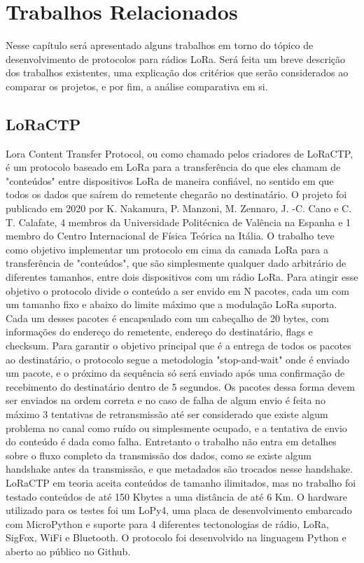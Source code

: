 \chapter{Trabalhos Relacionados}

Nesse capítulo será apresentado alguns trabalhos em torno do tópico de desenvolvimento
de protocolos para rádios LoRa. Será feita um breve descrição dos trabalhos existentes,
uma explicação dos critérios que serão considerados ao comparar os projetos, e por fim, a
análise comparativa em si.

\section{LoRaCTP}

Lora Content Transfer Protocol, ou como chamado pelos criadores de LoRaCTP, é um 
protocolo baseado em LoRa para a transferência do que eles chamam de "conteúdos" entre dispositivos LoRa de maneira confiável, no sentido em que todos os dados que saírem do
remetente chegarão no destinatário. O projeto foi publicado em 2020 por K. Nakamura, P. Manzoni, M. Zennaro, J. -C. Cano e C. T. Calafate, 4 membros da Universidade Politécnica de Valência na 
Espanha e 1 membro do Centro Internacional de Física Teórica na Itália. O trabalho teve
como objetivo implementar um protocolo em cima da camada LoRa para a transferência de "conteúdos", que são simplesmente qualquer dado arbitrário de diferentes tamanhos, entre dois dispositivos com um rádio LoRa. Para atingir esse objetivo o protocolo divide o
conteúdo a ser envido em N pacotes, cada um com um tamanho fixo e 
abaixo do limite máximo que a modulação LoRa suporta. Cada um desses pacotes é encapsulado com um cabeçalho de 20 bytes, com informações do endereço do remetente, endereço do destinatário, flags e checksum. Para garantir o objetivo principal que é a entrega
de todos os pacotes ao destinatário, o protocolo segue a metodologia "stop-and-wait"
onde é enviado um pacote, e o próximo da sequência só será enviado após uma confirmação de
recebimento do destinatário dentro de 5 segundos. Os pacotes dessa forma devem ser enviados na ordem correta e no caso de falha de algum envio é feita no máximo 3 tentativas de 
retransmissão até ser considerado que existe algum problema no canal como ruído ou simplesmente ocupado, e a tentativa de envio do conteúdo é dada como falha. Entretanto o 
trabalho não entra em detalhes sobre o fluxo completo da transmissão dos dados, como se 
existe algum handshake antes da transmissão, e que metadados são trocados nesse handshake. LoRaCTP em teoria aceita conteúdos de tamanho ilimitados, mas no trabalho foi testado
conteúdos de até 150 Kbytes a uma distância de até 6 Km. O hardware utilizado para os testes
foi um LoPy4, uma placa de desenvolvimento embarcado com MicroPython e suporte para 4 diferentes tectonologias de rádio, LoRa, SigFox, WiFi e Bluetooth. O protocolo foi desenvolvido na linguagem Python e aberto ao público no Github. \cite{9394317}

